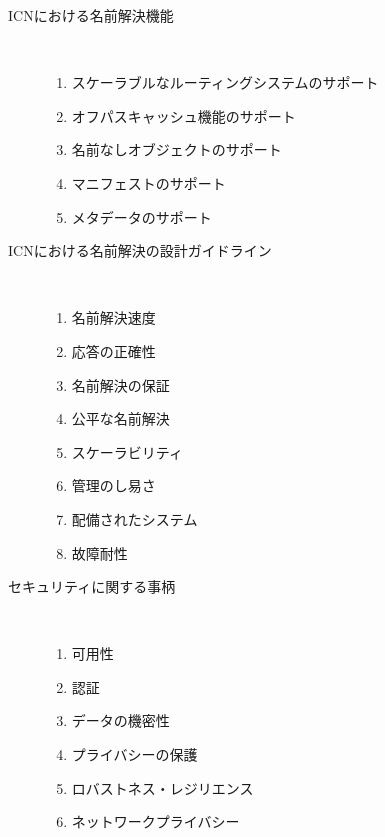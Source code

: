 \begin{description}
 \item[ICNにおける名前解決機能]\mbox{}\\
	 \vspace{-9mm}
	\begin{enumerate}
   \item スケーラブルなルーティングシステムのサポート
	 \vspace{-3mm}
	 \item オフパスキャッシュ機能のサポート
	 \vspace{-3mm}
	 \item 名前なしオブジェクトのサポート
	 \vspace{-3mm}
	 \item マニフェストのサポート
	 \vspace{-3mm}
	 \item メタデータのサポート
	\end{enumerate}
 \item[ICNにおける名前解決の設計ガイドライン]\mbox{}\\
	 \vspace{-9mm}
	\begin{enumerate}
	\item 名前解決速度
	 \vspace{-3mm}
	\item 応答の正確性
	 \vspace{-3mm}
	\item 名前解決の保証
	 \vspace{-3mm}
	\item 公平な名前解決
	 \vspace{-3mm}
	\item スケーラビリティ
	 \vspace{-3mm}
	\item 管理のし易さ
	 \vspace{-3mm}
	\item 配備されたシステム
	 \vspace{-3mm}
	\item 故障耐性
  \end{enumerate}
 \item[セキュリティに関する事柄]\mbox{}\\
	 \vspace{-9mm}
	\begin{enumerate}
   \item 可用性
	 \vspace{-3mm}
	 \item 認証
	 \vspace{-3mm}
	 \item データの機密性
	 \vspace{-3mm}
	 \item プライバシーの保護
	 \vspace{-3mm}
	 \item ロバストネス・レジリエンス
	 \vspace{-3mm}
	 \item ネットワークプライバシー
	\end{enumerate}
\end{description}


